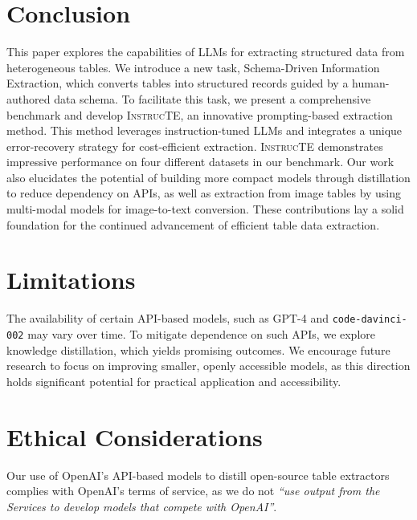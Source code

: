 \documentclass[11pt]{article}
\newcommand\method{\textsc{InstrucTE}}
\begin{document}
\section{Conclusion}
\label{sec:conclu}




This paper explores the capabilities of LLMs for extracting structured data from heterogeneous tables. 
We introduce a new task, Schema-Driven Information Extraction, which converts tables into structured records guided by a human-authored data schema.
To facilitate this task, we present a comprehensive benchmark and develop \method{}, an innovative prompting-based extraction method. This method leverages instruction-tuned LLMs and integrates a unique error-recovery strategy for cost-efficient extraction. 
\method{} demonstrates impressive performance on four different datasets in our benchmark.
Our work also elucidates the potential of building more compact models through distillation to reduce dependency on APIs, 
as well as extraction from image tables by using multi-modal models for image-to-text conversion.
These contributions lay a solid foundation for the continued advancement of efficient table data extraction.


\section*{Limitations}
The availability of certain API-based models, such as GPT-4 and \texttt{code-davinci-002} may vary over time.
To mitigate dependence on such APIs, we explore knowledge distillation, which yields promising outcomes. We encourage future research to focus on improving smaller, openly accessible models, as this direction holds significant potential for practical application and accessibility.


\section*{Ethical Considerations}
Our use of OpenAI's API-based models to distill open-source table extractors complies with OpenAI's terms of service, as we do not {\em ``use output from the Services to develop models that compete with OpenAI''}.  
\end{document}
